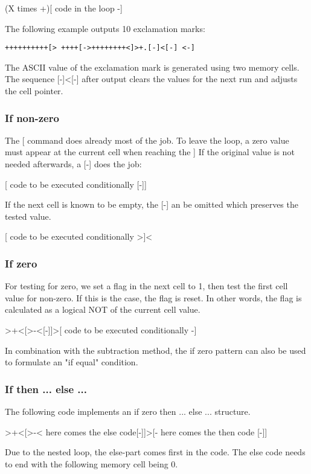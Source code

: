 \documentclass[ms,article,a4paper]{memoir}
\begin{document}
(X times +)[ code in the loop -]

The following example outputs 10 exclamation marks:

\begin{verbatim}
++++++++++[> ++++[->++++++++<]>+.[-]<[-] <-]
\end{verbatim}

The ASCII value of the exclamation mark is generated using two memory cells. The sequence [-]<[-] after output clears the values for the next run and adjusts the cell pointer.

\subsubsection{If non-zero}

The [ command does already most of the job. To leave the loop, a zero value must appear at the current cell when reaching the ]
If the original value is not needed afterwards, a [-] does the job:

[ code to be executed conditionally [-]]

If the next cell is known to be empty, the [-] an be omitted which preserves the tested value.

[ code to be executed conditionally >]<

\subsubsection{If zero}

For testing for zero, we set a flag in the next cell to 1, then test the first cell value for non-zero. If this is the case, the flag is reset. In other words, the flag is calculated as a logical NOT of the current cell value.

>+<[>-<[-]]>[ code to be executed conditionally -]

In combination with the subtraction method, the if zero pattern can also be used to formulate an "if equal" condition.

\subsubsection{If then ... else ...}

The following code implements an if zero then ... else ... structure.

>+<[>-< here comes the else code[-]]>[- here comes the then code [-]]

Due to the nested loop, the else-part comes first in the code. The else code needs to end with the following memory cell being 0.
\end{document}
